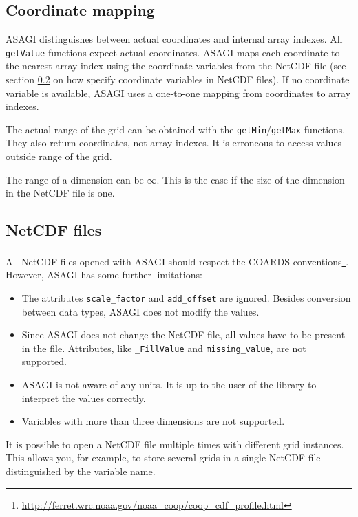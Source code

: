 \subsection{Coordinate mapping}

ASAGI distinguishes between actual coordinates and internal array indexes. All \texttt{getValue} functions expect actual coordinates. ASAGI maps each coordinate to the nearest array index using the coordinate variables from the NetCDF file (see section \ref{sec:netcdf files} on how specify coordinate variables in NetCDF files). If no coordinate variable is available, ASAGI uses a one-to-one mapping from coordinates to array indexes.

The actual range of the grid can be obtained with the \texttt{getMin}/\texttt{getMax} functions. They also return coordinates, not array indexes. It is erroneous to access values outside range of the grid.

The range of a dimension can be $\infty$. This is the case if the size of the dimension in the NetCDF file is one.

\subsection{NetCDF files}
\label{sec:netcdf files}

All NetCDF files opened with ASAGI should respect the COARDS conventions\footnote{\url{http://ferret.wrc.noaa.gov/noaa_coop/coop_cdf_profile.html}}. However, ASAGI has some further limitations:
\begin{itemize}
 \item The attributes \texttt{scale\_factor} and \texttt{add\_offset} are ignored. Besides conversion between data types, ASAGI does not modify the values.
 \item Since ASAGI does not change the NetCDF file, all values have to be present in the file. Attributes, like \texttt{\_FillValue} and \texttt{missing\_value}, are not supported.
 \item ASAGI is not aware of any units. It is up to the user of the library to interpret the values correctly.
 \item Variables with more than three dimensions are not supported.
\end{itemize}

It is possible to open a NetCDF file multiple times with different grid instances. This allows you, for example, to store several grids in a single NetCDF file distinguished by the variable name.
